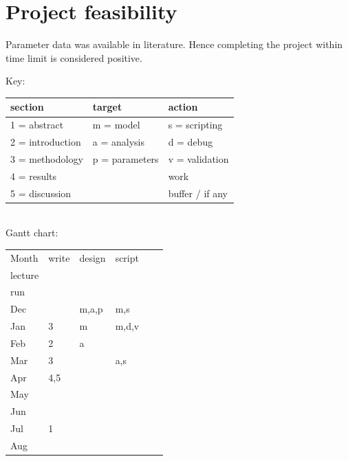 \documentclass[a4paper, 11pt]{article}
\begin{document}
\section{Project feasibility}
Parameter data was available in literature.  Hence completing the project within time limit is considered positive.

Key:
\begin{tabular}{lll}
	section & target & action\\\hline
	1 = abstract & m = model & s = scripting\\
	2 = introduction & a = analysis & d = debug\\
	3 = methodology & p = parameters & v = validation\\
	4 = results && \cellcolor{grey90}work\\
	5 = discussion && \cellcolor{lorange}buffer / if any\\
\end{tabular}\\
Gantt chart:
\begin{longtable}{p{.1\linewidth}|p{.1\linewidth}|p{.1\linewidth}|p{.1\linewidth}|p{.1\linewidth}|p{.1\linewidth}|}
	Month	&write					&design					&script					& \begin{tabular}{c}MSc\\lecture\end{tabular}	& \begin{tabular}{c}model\\run\end{tabular}\\\hline
	Dec		&						&\cellcolor{grey90}m,a,p	&\cellcolor{grey90}m,s	&\cellcolor{lorange}							&										\\
	Jan		&\cellcolor{grey90}3	&\cellcolor{grey90}m	&\cellcolor{grey90}m,d,v	&\cellcolor{lorange} 							&\cellcolor{grey90}						\\
	Feb		&\cellcolor{grey90}2	&\cellcolor{grey90}a	&						&\cellcolor{lorange} 							&\cellcolor{grey90}						\\
	Mar		&\cellcolor{lorange}3	&\cellcolor{lorange}	&\cellcolor{grey90}a,s	&\cellcolor{lorange} 							&\cellcolor{grey90}						\\
	Apr		&\cellcolor{grey90}4,5	&						&\cellcolor{grey90}		&												&\cellcolor{grey90}						\\
	May		&\cellcolor{grey90}		&						&\cellcolor{grey90}		&												&\cellcolor{grey90}						\\
	Jun		&\cellcolor{grey90}		&						&\cellcolor{lorange}	&												&\cellcolor{lorange}					\\
	Jul		&\cellcolor{grey90}1	&						&						&												&\cellcolor{lorange}					\\
	Aug		&\cellcolor{lorange}	&						&\cellcolor{lorange}	&												&\cellcolor{lorange}					\\
\end{longtable}
\end{document}
